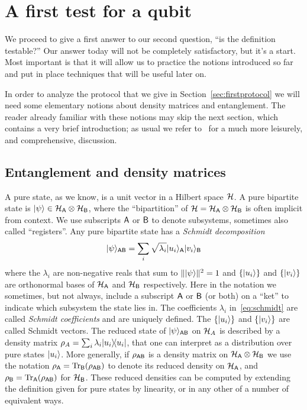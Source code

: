 \section{A first test for a qubit}
\label{sec:first-qubit}

We proceed to give a first answer to our second question, ``is the definition testable?'' Our answer today will not be completely satisfactory, but it's a start. Most important is that it will allow us to practice the notions introduced so far and  put in place techniques that will be useful later on. 

In order to analyze the protocol that we give in Section~\ref{sec:firstprotocol} we will need some elementary notions about density matrices and entanglement. The reader already familiar with these notions may skip the next section, which contains a very brief introduction; as usual we refer to~\cite{nielsen2002quantum} for a much more leisurely, and comprehensive, discussion. 

\subsection{Entanglement and density matrices}

A pure state, as we know, is a unit vector in a Hilbert space $\mathcal{H}$. A pure bipartite state is $|\psi\rangle \in \mathcal{H}_{\textsf{A}} \otimes \mathcal{H}_{\textsf{B}}$, where the ``bipartition'' of $\mathcal{H} = \mathcal{H}_{\textsf{A}} \otimes \mathcal{H}_{\textsf{B}}$ is often implicit from context. We use subscripts ${\textsf{A}}$ or ${\textsf{B}}$ to denote subsystems, sometimes also called ``registers''. Any pure bipartite state has a \emph{Schmidt decomposition} 
\begin{equation}\label{eq:schmidt}
|\psi\rangle_{{\textsf{AB}}} = \sum_i \sqrt{\lambda_i} |u_i\rangle_{{\textsf{A}}} |v_i\rangle_{{\textsf{B}}}
\end{equation}
where the $\lambda_i$ are non-negative reals that sum to $\||\psi\rangle\|^2=1$ and $\{|u_i\rangle\}$ and $\{|v_i\rangle\}$ are orthonormal bases of $\mathcal{H}_{\textsf{A}}$ and $\mathcal{H}_{\textsf{B}}$ respectively. Here in the notation we sometimes, but not always, include a subscript ${\textsf{A}}$ or ${\textsf{B}}$ (or both) on a ``ket'' to indicate which subsystem the state lies in. 
 The coefficients $\lambda_i$ in~\eqref{eq:schmidt} are called \emph{Schmidt coefficients} and are uniquely defined. The  $\{|u_i\rangle\}$ and  $\{|v_i\rangle\}$ are called Schmidt vectors. The reduced state of $|\psi\rangle_{{\textsf{AB}}}$ on $\mathcal{H}_A$ is described by a density matrix $\rho_A = \sum_i \lambda_i |u_i\rangle\!\langle u_i|$, that one can interpret as a distribution over pure states $|u_i\rangle$. More generally, if $\rho_{{\textsf{AB}}}$ is a density matrix on  $\mathcal{H}_{\textsf{A}} \otimes \mathcal{H}_{\textsf{B}}$  we use the notation $\rho_{{\textsf{A}}} = \mbox{\rm Tr}_{{\textsf{B}}}(\rho_{{\textsf{AB}}})$ to denote its reduced density on $\mathcal{H}_{\textsf{A}}$, and $\rho_{{\textsf{B}}}=\mbox{\rm Tr}_{{\textsf{A}}}(\rho_{{\textsf{AB}}})$ for $\mathcal{H}_{\textsf{B}}$. These reduced densities can be computed by extending the definition given for pure states by linearity, or in any other of a number of equivalent ways. 

